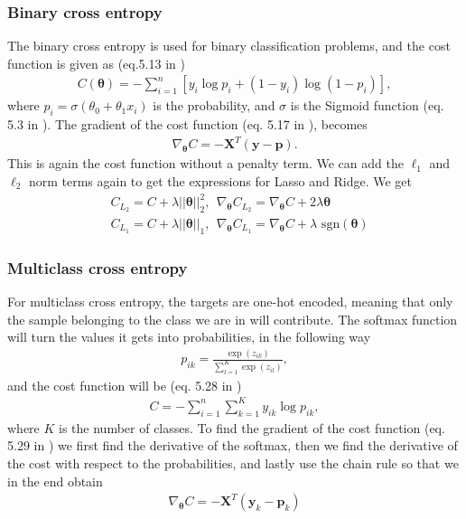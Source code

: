 \documentclass[reprint,english,notitlepage, floatfix]{revtex4-2}  %
\begin{document}
    \subsubsection{Binary cross entropy}
    
    The binary cross entropy is used for binary classification problems, and the cost function is given as (eq.5.13 in \cite{lecture_book})
    \begin{align}\label{eq: cost func of binary cross entropy}
        C(\bm{\theta}) = - \sum_{i = 1}^n \left[y_i \log p_i + (1 - y_i) \log (1 - p_i)\right],
    \end{align}
    where $p_i = \sigma \left(\theta_0 + \theta_1 x_i\right)$ is the probability, and $\sigma$ is the Sigmoid function (eq. 5.3 in \cite{lecture_book}). The gradient of the cost function (eq. 5.17 in \cite{lecture_book}),  becomes 
    \begin{align}
        \nabla_{\bm{\theta}} C = - \bm{X}^T \left(\bm{y} - \bm{p}\right).
    \end{align}
    This is again the cost function without a penalty term. We can add the $\ell_1$ and $\ell_2$ norm terms again to get the expressions for Lasso and Ridge. We get
    \begin{align}
        & C_{L_2} = C + \lambda ||\bm{\theta}||_2^2, \: \: \nabla_{\bm{\theta}} C_{L_2} = \nabla_{\bm{\theta}} C + 2\lambda\bm{\theta}\\
        & C_{L_1} = C + \lambda ||\bm{\theta}||_1, \: \: \nabla_{\bm{\theta}} C_{L_1} = \nabla_{\bm{\theta}} C + \lambda\text{ sgn}(\bm{\theta})
    \end{align}
    
    \subsubsection{Multiclass cross entropy}
    
    For multiclass cross entropy, the targets are one-hot encoded, meaning that only the sample belonging to the class we are in will contribute. The softmax function will turn the values it gets into probabilities, in the following way
    \begin{align*}
        p_{ik} = \frac{\exp(z_{ik})}{\sum_{l = 1}^K\exp(z_{il})}, 
    \end{align*}
    and the cost function will be (eq. 5.28 in \cite{lecture_book})
    \begin{align}\label{eq: cost func of multiclass cross entropy}
        C = - \sum_{i = 1}^n \sum_{k = 1}^K y_{ik} \log p_{ik},
    \end{align}
    where $K$ is the number of classes. To find the gradient of the cost function (eq. 5.29 in \cite{lecture_book}) we first find the derivative of the softmax, then we find the derivative of the cost with respect to the probabilities, and lastly use the chain rule so that we in the end obtain
    \begin{align}\label{eq: gradient for cost of multicross}
        \nabla_{\bm{\theta}} C = - \bm{X}^T \left( \bm{y}_k - \bm{p}_k\right)
    \end{align}
    
\end{document}
